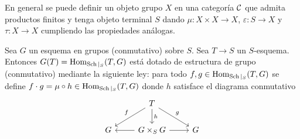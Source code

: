 \documentclass[GA.tex]{subfiles}
\begin{document}
En general se puede definir un objeto grupo $X$ en una categoría $\mathcal{C}$ que admita productos finitos y tenga objeto terminal $S$ dando  $\mu:X\times X\to X$, $\varepsilon:S\to X$ y $\tau:X\to X$ cumpliendo las propiedades análogas. 

\begin{prop}
Sea $G$ un esquema en grupos (conmutativo) sobre $S$. Sea $T\to S$ un $S$-esquema. Entonces $G(T)=\operatorname{Hom}_{\operatorname{Sch}|_S}(T,G)$ está dotado de estructura de grupo (conmutativo) mediante la siguiente ley: para todo $f,g\in\operatorname{Hom}_{\operatorname{Sch}|_S}(T,G)$ se define $f\cdot g=\mu\circ h\in\operatorname{Hom}_{\operatorname{Sch}|_S}(T,G)$ donde $h$ satisface el diagrama conmutativo
\[
\begin{tikzcd}
 & T\arrow[dl, "f"']\arrow[dr, "g"]\arrow[d, "h"] & \\
 G & G\times_S G\arrow[r] \arrow[l] & G
\end{tikzcd}
\]
\end{prop}
\end{document}
